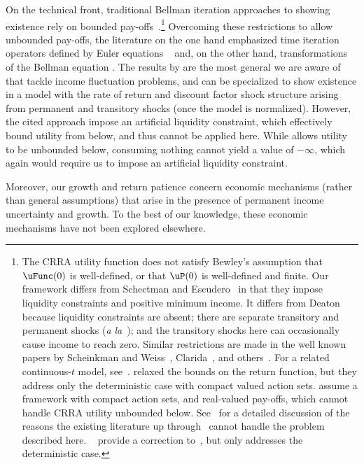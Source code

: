 \documentclass[BufferStockTheory]{subfiles}
\begin{document}
On the technical front, traditional Bellman iteration approaches to showing existence rely on bounded pay-offs~\citep{slpMethods}.\footnote{The CRRA utility function does not satisfy Bewley's assumption that $\uFunc(0)$ is well-defined, or that $\uP(0)$ is well-defined and finite.
Our framework differs from Schectman and Escudero~\citeyearpar{seIncFluct} in that they impose liquidity constraints and positive minimum income.
It differs from Deaton~\citeyearpar{deatonLiqConstr} because liquidity constraints are absent; there are separate transitory and permanent shocks (\textit{a la}~\cite{muthOptimal}); and the transitory shocks here can occasionally cause income to reach zero.
Similar restrictions are made in the well known papers by Scheinkman and Weiss~\citeyearpar{scheinkman&weiss:borrowing}, Clarida~\citep{claridaErgodic}, and others~\cite{cwcUnderUncert}.
For a related continuous-$t$ model, see~\cite{tocheUrisk}.
\cite{asHomogeneous} relaxed the bounds on the return function, but they address only the deterministic case with compact valued action sets.
\cite{mnUnique} assume a framework with compact action sets, and real-valued pay-offs, which cannot handle CRRA utility unbounded below.
See~\cite{yaoNote} for a detailed discussion of the reasons the existing literature up through~\cite{mnUnique} cannot handle the problem described here.
\@~\cite{mvExistence} provide a correction to~\cite{rrExistence}, but only addresses the deterministic case.} Overcoming these restrictions to allow unbounded pay-offs, the literature on the one hand emphasized time iteration operators defined by Euler equations ~\citep{deatonLiqConstr, lsIncFluct, mstIncFluct} and, on the other hand, transformations of the Bellman equation  \citep{maUnboundedDP, rinconZapatero2024}.
The results by \cite{mstIncFluct,maUnboundedDP} are the most general we are aware of that tackle income fluctuation problems, and can be specialized to show existence in a model with the rate of return and discount factor shock structure arising from permanent and transitory shocks (once the model is normalized).
However, the cited approach impose an artificial liquidity constraint, which effectively bound utility from below, and thus cannot be applied here.
While \cite{rinconZapatero2024} allows utility to be unbounded below, consuming nothing cannot yield a value of $-\infty$, which again would require us to impose an artificial liquidity constraint.


Moreover, our  growth and return patience concern economic mechanisms (rather than general assumptions) that arise in the presence of permanent income uncertainty and growth.
To the best of our knowledge, these economic mechanisms have not been explored elsewhere.
\end{document}
